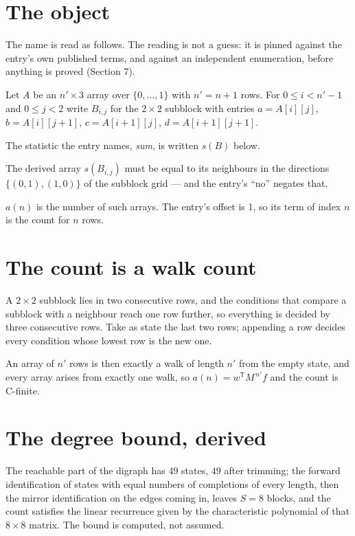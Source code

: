 \documentclass[11pt]{article}
\theoremstyle{definition}
\begin{document}
\section{The object}

The name is read as follows. The reading is not a guess: it is pinned against the entry's own published terms, and against an independent enumeration, before anything is proved (Section 7).

Let $A$ be an $n' \times 3$ array over $\{0,\dots,1\}$ with $n' = n + 1$ rows. For $0 \le i < n'-1$ and $0 \le j < 2$ write $B_{i,j}$ for the $2\times2$ subblock with entries $a = A[i][j]$, $b = A[i][j{+}1]$, $c = A[i{+}1][j]$, $d = A[i{+}1][j{+}1]$.

The statistic the entry names, {\itshape sum}, is written $s(B)$ below.

The derived array $s(B_{i,j})$ must be equal to its neighbours in the directions $\{(0,1), (1,0)\}$ of the subblock grid --- and the entry's ``no'' negates that.

$a(n)$ is the number of such arrays. The entry's offset is 1, so its term of index $n$ is the count for $n$ rows.

\section{The count is a walk count}

A $2\times2$ subblock lies in two consecutive rows, and the conditions that compare a subblock with a neighbour reach one row further, so everything is decided by three consecutive rows. Take as state the last two rows; appending a row decides every condition whose lowest row is the new one.

An array of $n'$ rows is then exactly a walk of length $n'$ from the empty state, and every array arises from exactly one walk, so $a(n) = w^{\mathsf T}M^{\,n'}f$ and the count is C-finite.

\section{The degree bound, derived}

The reachable part of the digraph has $49$ states, $49$ after trimming; the forward identification of states with equal numbers of completions of every length, then the mirror identification on the edges coming in, leaves $S = 8$ blocks, and the count satisfies the linear recurrence given by the characteristic polynomial of that $8\times8$ matrix. The bound is computed, not assumed.
\end{document}
